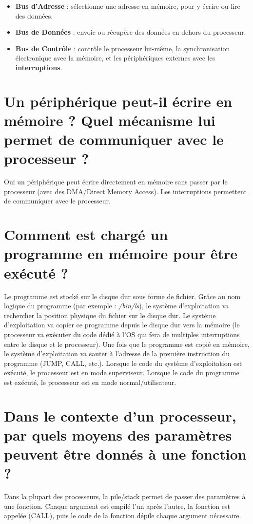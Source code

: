 \documentclass[11pt,a4paper]{article}
\begin{document}
\bigskip
\begin{itemize}
\item \textbf{Bus d'Adresse} : sélectionne une adresse en mémoire, pour y écrire ou lire des données.
\item \textbf{Bus de Données} : envoie ou récupère des données en dehors du processeur.
\item \textbf{Bus de Contrôle} : contrôle le processeur lui-même, la synchronisation électronique avec la mémoire, et les périphériques externes avec les \textbf{interruptions}.
\end{itemize}

\section{Un périphérique peut-il écrire en mémoire ? Quel mécanisme lui permet de communiquer avec le processeur ?}

\bigskip
\noindent Oui un périphérique peut écrire directement en mémoire sans passer par le processeur (avec des DMA/Direct Memory Access).
Les interruptions permettent de communiquer avec le processeur.

\section{Comment est chargé un programme en mémoire pour être exécuté ?}

\bigskip
\noindent Le programme est stocké sur le disque dur sous forme de fichier.
Grâce au nom logique du programme (par exemple : \textit{/bin/ls}), le système d'exploitation va rechercher la position physique du fichier sur le disque dur.
Le système d'exploitation va copier ce programme depuis le disque dur vers la mémoire (le processeur va exécuter du code dédié à l'OS qui fera de multiples interruptions entre le disque et le processeur).
Une fois que le programme est copié en mémoire, le système d'exploitation va sauter à l'adresse de la première instruction du programme (JUMP, CALL, etc.).
Lorsque le code du système d'exploitation est exécuté, le processeur est en mode superviseur.
Lorsque le code du programme est exécuté, le processeur est en mode normal/utilisateur.

\section{Dans le contexte d'un processeur, par quels moyens des paramètres peuvent être donnés à une fonction ?}

\bigskip
\noindent Dans la plupart des processeurs, la pile/stack permet de passer des paramètres à une fonction.
Chaque argument est empilé l'un après l'autre, la fonction est appelée (CALL), puis le code de la fonction dépile chaque argument nécessaire.
\end{document}

